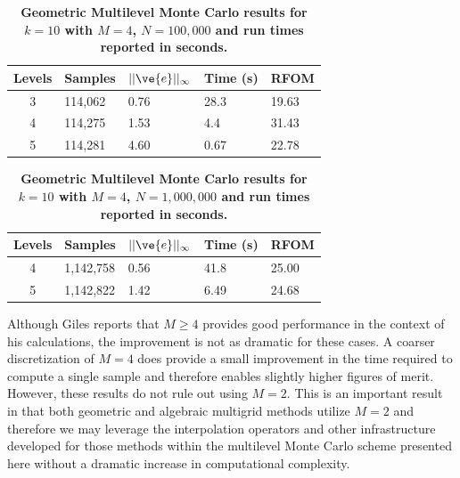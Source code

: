 \documentclass[note]{TechNote}
\begin{document}
\begin{table}[h!]
  \begin{center}
    \begin{tabular}{cllll}\hline\hline
      \multicolumn{1}{c}{\textbf{Levels}} & 
      \multicolumn{1}{l}{\textbf{Samples}} & 
      \multicolumn{1}{l}{\textbf{$||\ve{e}||_{\infty}$}} & 
      \multicolumn{1}{l}{\textbf{Time (s)}} & 
      \multicolumn{1}{l}{\textbf{RFOM}} \\
      \hline
      3 & 114,062 & 0.76 & 28.3 & 19.63 \\
      4 & 114,275 & 1.53 & 4.4 & 31.43 \\
      5 & 114,281 & 4.60 & 0.67 & 22.78 \\
      \hline\hline
    \end{tabular}
  \end{center}
  \caption{\textbf{Geometric Multilevel Monte Carlo results for $k =
      10$ with $M = 4$, $N = 100,000$ and run times reported in
      seconds.}}
  \label{tab:n5_results}
\end{table}
\begin{table}[h!]
  \begin{center}
    \begin{tabular}{cllll}\hline\hline
      \multicolumn{1}{c}{\textbf{Levels}} & 
      \multicolumn{1}{l}{\textbf{Samples}} & 
      \multicolumn{1}{l}{\textbf{$||\ve{e}||_{\infty}$}} & 
      \multicolumn{1}{l}{\textbf{Time (s)}} & 
      \multicolumn{1}{l}{\textbf{RFOM}} \\
      \hline
      4 & 1,142,758 & 0.56 & 41.8 & 25.00 \\
      5 & 1,142,822 & 1.42 & 6.49 & 24.68 \\
      \hline\hline
    \end{tabular}
  \end{center}
  \caption{\textbf{Geometric Multilevel Monte Carlo results for $k =
      10$ with $M = 4$, $N = 1,000,000$ and run times reported in
      seconds.}}
  \label{tab:n6_results}
\end{table}
Although Giles reports that $M \geq 4$ provides good performance in
the context of his calculations, the improvement is not as dramatic
for these cases. A coarser discretization of $M=4$ does provide a
small improvement in the time required to compute a single sample and
therefore enables slightly higher figures of merit. However, these
results do not rule out using $M=2$. This is an important result in
that both geometric and algebraic multigrid methods utilize $M=2$ and
therefore we may leverage the interpolation operators and other
infrastructure developed for those methods within the multilevel Monte
Carlo scheme presented here without a dramatic increase in
computational complexity.
\end{document}
